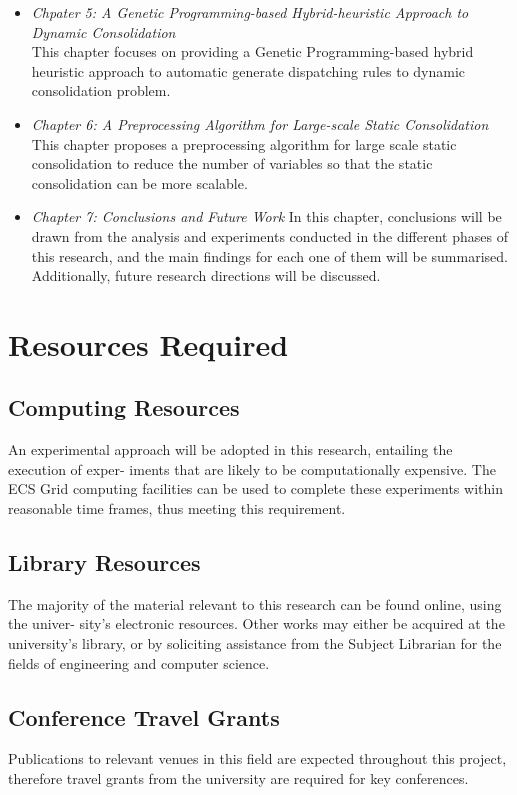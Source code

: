 \begin{itemize}
	\item \textit{Chpater 5: A Genetic Programming-based Hybrid-heuristic Approach to Dynamic Consolidation} \\
	This chapter focuses on providing a Genetic Programming-based hybrid heuristic approach to automatic generate
	dispatching rules to dynamic consolidation problem.
	\item \textit{Chapter 6: A Preprocessing Algorithm for Large-scale Static Consolidation}\\
	This chapter proposes a preprocessing algorithm for large scale static consolidation to reduce the number of variables so that the static consolidation can be more scalable. 
	\item \textit{Chapter 7: Conclusions and Future Work}
	In this chapter, conclusions will be drawn from the analysis and experiments conducted in the different phases of this research, and the main findings for each one of them will be summarised. Additionally, future research directions will be discussed.

\end{itemize}


\section{Resources Required}
\subsection{Computing Resources}
An experimental approach will be adopted in this research, entailing the execution of exper-
iments that are likely to be computationally expensive. The ECS Grid computing facilities
can be used to complete these experiments within reasonable time frames, thus meeting this requirement.
\subsection{Library Resources}
The majority of the material relevant to this research can be found online, using the univer-
sity’s electronic resources. Other works may either be acquired at the university’s library, or
by soliciting assistance from the Subject Librarian for the fields of engineering and computer science.
\subsection{Conference Travel Grants}
Publications to relevant venues in this field are expected throughout this project, therefore
travel grants from the university are required for key conferences.